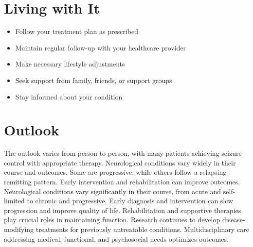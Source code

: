 \section{Living with It}
\begin{itemize}[noitemsep]
  \item Follow your treatment plan as prescribed
  \item Maintain regular follow-up with your healthcare provider
  \item Make necessary lifestyle adjustments
  \item Seek support from family, friends, or support groups
  \item Stay informed about your condition
\end{itemize}
\section{Outlook}
The outlook varies from person to person, with many patients achieving seizure control with appropriate therapy. Neurological conditions vary widely in their course and outcomes. Some are progressive, while others follow a relapsing-remitting pattern. Early intervention and rehabilitation can improve outcomes. Neurological conditions vary significantly in their course, from acute and self-limited to chronic and progressive. Early diagnosis and intervention can slow progression and improve quality of life. Rehabilitation and supportive therapies play crucial roles in maintaining function. Research continues to develop disease-modifying treatments for previously untreatable conditions. Multidisciplinary care addressing medical, functional, and psychosocial needs optimizes outcomes.

